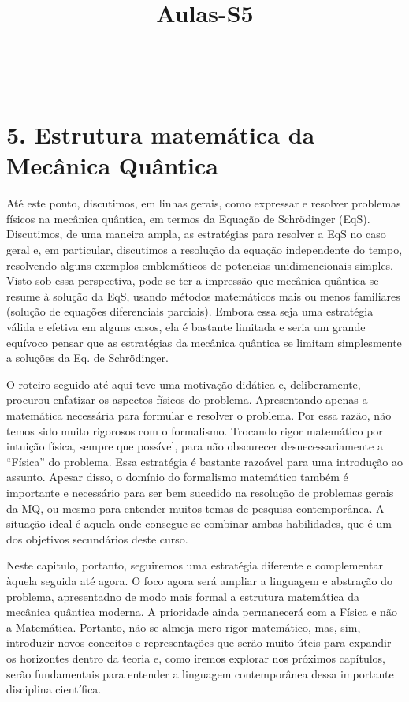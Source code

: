 \documentclass[11pt]{article}
\title{Aulas-S5}
\begin{document}
    
    \maketitle
    
    

    
    \(\newcommand{\bra}[1]{\left\langle #1 \right|}\)
\(\newcommand{\ket}[1]{\left| #1 \right\rangle}\)
\(\newcommand{\braket}[3]{\left\langle #1 \middle| #2 \middle| #3 \right\rangle}\)

\hypertarget{estrutura-matemuxe1tica-da-mecuxe2nica-quuxe2ntica}{%
\section{5. Estrutura matemática da Mecânica
Quântica}\label{estrutura-matemuxe1tica-da-mecuxe2nica-quuxe2ntica}}

Até este ponto, discutimos, em linhas gerais, como expressar e resolver
problemas físicos na mecânica quântica, em termos da Equação de
Schrödinger (EqS). Discutimos, de uma maneira ampla, as estratégias para
resolver a EqS no caso geral e, em particular, discutimos a resolução da
equação independente do tempo, resolvendo alguns exemplos emblemáticos
de potencias unidimencionais simples. Visto sob essa perspectiva,
pode-se ter a impressão que mecânica quântica se resume à solução da
EqS, usando métodos matemáticos mais ou menos familiares (solução de
equações diferenciais parciais). Embora essa seja uma estratégia válida
e efetiva em alguns casos, ela é bastante limitada e seria um grande
equívoco pensar que as estratégias da mecânica quântica se limitam
simplesmente a soluções da Eq. de Schrödinger.

O roteiro seguido até aqui teve uma motivação didática e, deliberamente,
procurou enfatizar os aspectos físicos do problema. Apresentando apenas
a matemática necessária para formular e resolver o problema. Por essa
razão, não temos sido muito rigorosos com o formalismo. Trocando rigor
matemático por intuição física, sempre que possível, para não obscurecer
desnecessariamente a ``Física'' do problema. Essa estratégia é bastante
razoável para uma introdução ao assunto. Apesar disso, o domínio do
formalismo matemático também é importante e necessário para ser bem
sucedido na resolução de problemas gerais da MQ, ou mesmo para entender
muitos temas de pesquisa contemporânea. A situação ideal é aquela onde
consegue-se combinar ambas habilidades, que é um dos objetivos
secundários deste curso.

Neste capitulo, portanto, seguiremos uma estratégia diferente e
complementar àquela seguida até agora. O foco agora será ampliar a
linguagem e abstração do problema, apresentadno de modo mais formal a
estrutura matemática da mecânica quântica moderna. A prioridade ainda
permanecerá com a Física e não a Matemática. Portanto, não se almeja
mero rigor matemático, mas, sim, introduzir novos conceitos e
representações que serão muito úteis para expandir os horizontes dentro
da teoria e, como iremos explorar nos próximos capítulos, serão
fundamentais para entender a linguagem contemporânea dessa importante
disciplina científica.
\end{document}
